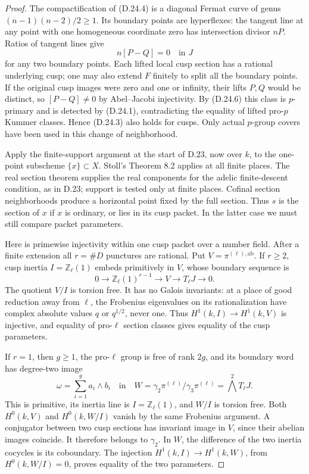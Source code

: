 \begin{proof}
The compactification of (D.24.4) is a
diagonal Fermat curve of genus
\((n-1)(n-2)/2\ge1\). Its boundary points
are hyperflexes: the tangent line at any
point with one homogeneous coordinate
zero has intersection divisor \(nP\).
Ratios of tangent lines give
\[
                   n[P-Q]=0\quad\text{in }J       \tag{D.24.6}
\]
for any two boundary points. Each lifted
local cusp section has a rational underlying
cusp; one may also extend \(F\) finitely
to split all the boundary points. If
the original cusp images were zero and
one or infinity, their lifts \(P,Q\)
would be distinct, so \([P-Q]\ne0\)
by Abel--Jacobi injectivity. By (D.24.6)
this class is \(p\)-primary and is
detected by (D.24.1), contradicting the
equality of lifted pro-\(p\) Kummer classes.
Hence (D.24.3) also holds for cusps.
Only actual \(p\)-group covers have been
used in this change of neighborhood.

Apply the finite-support argument at
the start of D.23, now over \(k\), to
the one-point subscheme \(\{x\}\subset X\).
Stoll's Theorem 8.2 applies at all finite
places. The real section theorem supplies
the real components for the adelic
finite-descent condition, as in D.23;
support is tested only at finite places.
Cofinal section neighborhoods
produce a horizontal point fixed by the
full section. Thus \(s\) is the section
of \(x\) if \(x\) is ordinary, or lies
in its cusp packet. In the latter case
we must still compare packet parameters.

Here is primewise injectivity within
one cusp packet over a number field.
After a finite extension all \(r=\#D\)
punctures are rational. Put
\(V=\pi^{(\ell),\mathrm{ab}}\). If
\(r\ge2\), cusp inertia
\(I=\mathbb Z_\ell(1)\) embeds primitively
in \(V\), whose boundary sequence is
\[
 0\longrightarrow\mathbb Z_\ell(1)^{r-1}
 \longrightarrow V\longrightarrow T_\ell J
 \longrightarrow0.
\]
The quotient \(V/I\) is torsion free.
It has no Galois invariants: at a place
of good reduction away from \(\ell\),
the Frobenius eigenvalues on its
rationalization have complex absolute
values \(q\) or \(q^{1/2}\), never one.
Thus \(H^1(k,I)\to H^1(k,V)\) is
injective, and equality of pro-\(\ell\)
section classes gives equality of the
cusp parameters.

If \(r=1\), then \(g\ge1\), the pro-\(\ell\)
group is free of rank \(2g\), and its
boundary word has degree-two image
\[
 \omega=\sum_{i=1}^g a_i\wedge b_i
 \quad\text{in}\quad
 W=\gamma_2\pi^{(\ell)}/\gamma_3\pi^{(\ell)}
        =\bigwedge^2 T_\ell J.                   \tag{D.24.7}
\]
This is primitive, its inertia line is
\(I=\mathbb Z_\ell(1)\), and \(W/I\)
is torsion free. Both \(H^0(k,V)\)
and \(H^0(k,W/I)\) vanish by the same
Frobenius argument. A conjugator between
two cusp sections has invariant image
in \(V\), since their abelian images
coincide. It therefore belongs to
\(\gamma_2\). In \(W\), the difference
of the two inertia cocycles is its
coboundary. The injection
\(H^1(k,I)\to H^1(k,W)\), from
\(H^0(k,W/I)=0\), proves equality of
the two parameters.


\end{proof}
